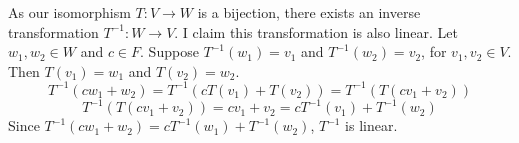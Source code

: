 \documentclass[12pt]{article}
\begin{document}
As our isomorphism $T: V \rightarrow W$ is a bijection, there exists an inverse transformation $T^{-1} : W \rightarrow V$. I claim this transformation is also linear. Let $w_1, w_2 \in W$ and $c \in F$. Suppose $T^{-1}(w_1) = v_1$ and $T^{-1}(w_2) = v_2$, for $v_1, v_2 \in V$. Then $T(v_1) = w_1$ and $T(v_2) = w_2$.
$$T^{-1}(c w_1 + w_2) = T^{-1}(cT(v_1) + T(v_2)) = T^{-1}(T(c v_1 + v_2))$$ 
$$T^{-1}(T(c v_1 + v_2)) = c v_1 + v_2 = c T^{-1}(v_1) + T^{-1}(w_2)$$
Since $T^{-1}(c w_1 + w_2) = c T^{-1}(w_1) + T^{-1}(w_2)$, $T^{-1}$ is linear.\\
\end{document}
